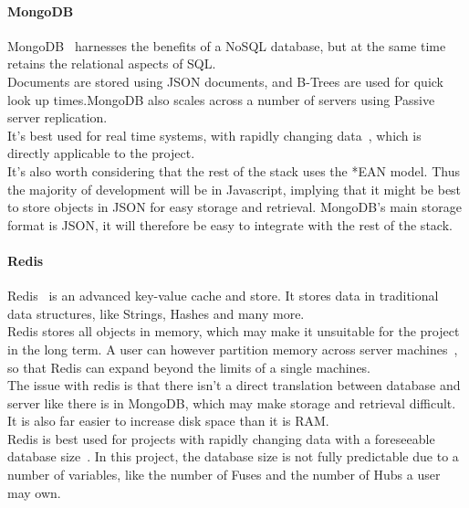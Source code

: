 \documentclass[preprint,12pt,3p]{elsarticle}
\begin{document}
\paragraph{MongoDB}
MongoDB~\cite{mongodb} harnesses the benefits of a NoSQL database, but at the same time retains the relational aspects of SQL.\\
Documents are stored using JSON documents, and B-Trees are used for quick look up times.MongoDB also scales across a number of servers using Passive server replication.\\
It's best used for real time systems, with rapidly changing data~\cite{databasecomparison}, which is directly applicable to the project.\\
It's also worth considering that the rest of the stack uses the *EAN model. Thus the majority of development will be in Javascript, implying that it might be best to store objects in JSON for easy storage and retrieval. MongoDB's main storage format is JSON, it will therefore be easy to integrate with the rest of the stack. 

\paragraph{Redis}
Redis~\cite{redis} is an advanced key-value cache and store. It stores data in traditional data structures, like Strings, Hashes and many more.\\
Redis stores all objects in memory, which may make it unsuitable for the project in the long term. A user can however partition memory across server machines~\cite{redisfaq}, so that Redis can expand beyond the limits of a single machines.\\
The issue with redis is that there isn't a direct translation between database and server like there is in MongoDB, which may make storage and retrieval difficult. It is also far easier to increase disk space than it is RAM.\\
Redis is best used for projects with rapidly changing data with a foreseeable database size~\cite{databasecomparison}. In this project, the database size is not fully predictable due to a number of variables, like the number of Fuses and the number of Hubs a user may own.
\end{document}
